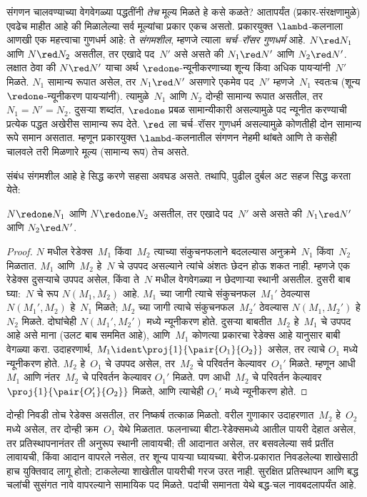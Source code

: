 संगणन चालवण्याच्या वेगवेगळ्या पद्धतींनी \emph{तेच}
मूल्य मिळते हे कसे कळते? आतापर्यंत (प्रकार-संरक्षणामुळे)
एवढेच माहीत आहे की मिळालेल्या सर्व मूल्यांचा प्रकार एकच
असतो. प्रकारयुक्त $\lambd$-कलनाला आणखी एक महत्त्वाचा
गुणधर्म आहे: ते \emph{संगमशील}, म्हणजे त्याला
\emph{चर्च–रॉसर गुणधर्म} आहे. $N \red N_1$ आणि
$N \red N_2$ असतील, तर एखादे पद~$N'$ असे असते की
$N_1 \red N'$ आणि $N_2 \red N'$. लक्षात ठेवा की
$N \red N'$ याचा अर्थ $\redone$-न्यूनीकरणाच्या
शून्य किंवा अधिक पायऱ्यांनी~$N'$ मिळते.
$N_1$ सामान्य रूपात असेल, तर $N_1 \red N'$ असणारे
एकमेव पद~$N'$ म्हणजे~$N_1$ स्वतःच (शून्य
$\redone$-न्यूनीकरण पायऱ्यांनी). त्यामुळे~$N_1$ आणि
$N_2$ दोन्ही सामान्य रूपात असतील, तर $N_1 = N' = N_2$.
दुसऱ्या शब्दांत, $\redone$ प्रबळ सामान्यीकारी असल्यामुळे
पद न्यूनीत करण्याची प्रत्येक पद्धत अखेरीस सामान्य रूप देते.
$\red$ ला चर्च–रॉसर गुणधर्म असल्यामुळे कोणतीही दोन
सामान्य रूपे समान असतात. म्हणून प्रकारयुक्त
$\lambd$-कलनातील संगणन नेहमी थांबते आणि ते कसेही
चालवले तरी मिळणारे मूल्य (सामान्य रूप) तेच असते.

संबंध संगमशील आहे हे सिद्ध करणे सहसा अवघड असते.
तथापि, पुढील दुर्बल अट सहज सिद्ध करता येते:

\begin{prop}[दुर्बल चर्च–रॉसर गुणधर्म]
$N \redone N_1$ आणि $N \redone N_2$ असतील, तर एखादे
पद~$N'$ असे असते की $N_1 \red N'$ आणि $N_2 \red N'$.
\end{prop}

\begin{proof}
  $N$ मधील रेडेक्स~$M_1$ किंवा~$M_2$ त्याच्या संकुचनफलाने
  बदलल्यास अनुक्रमे~$N_1$ किंवा~$N_2$ मिळतात.
  $M_1$ आणि~$M_2$ हे~$N$ चे उपपद असल्याने त्यांचे
  अंशतः छेदन होऊ शकत नाही. म्हणजे एक रेडेक्स दुसऱ्याचे
  उपपद असेल, किंवा ते~$N$ मधील वेगवेगळ्या न छेदणाऱ्या
  स्थानी असतील. दुसरी बाब घ्या:~$N$ चे रूप $N(M_1,M_2)$
  आहे. $M_1$ च्या जागी त्याचे संकुचनफल~$M_1'$ ठेवल्यास
  $N(M_1',M_2)$ हे~$N_1$ मिळते; $M_2$ च्या जागी त्याचे
  संकुचनफल~$M_2'$ ठेवल्यास $N(M_1,M_2')$ हे~$N_2$
  मिळते. दोघांचेही $N(M_1',M_2')$ मध्ये न्यूनीकरण होते.
  दुसऱ्या बाबतीत~$M_2$ हे~$M_1$ चे उपपद आहे असे माना
  (उलट बाब सममित आहे), आणि~$M_1$ कोणत्या प्रकारचा
  रेडेक्स आहे यानुसार बाबी वेगळ्या करा. उदाहरणार्थ,
  $M_1 \ident \proj{1}{\pair{O_1}{O_2}}$ असेल, तर त्याचे
  $O_1$ मध्ये न्यूनीकरण होते. $M_2$ हे~$O_1$ चे उपपद
  असेल, तर~$M_2$ चे परिवर्तन केल्यावर~$O_1'$ मिळते.
  म्हणून आधी~$M_1$ आणि नंतर~$M_2$ चे परिवर्तन केल्यावर
  $O_1'$ मिळते. पण आधी~$M_2$ चे परिवर्तन केल्यावर
  $\proj{1}{\pair{O_1'}{O_2}}$ मिळते, आणि त्याचेही
  $O_1'$ मध्ये न्यूनीकरण होते.
\end{proof}
दोन्ही निवडी तोच रेडेक्स असतील, तर निष्कर्ष तत्काळ
मिळतो. वरील गुणाकार उदाहरणात~$M_2$ हे~$O_2$ मध्ये
असेल, तर दोन्ही क्रम~$O_1$ येथे मिळतात. फलनाच्या
बीटा-रेडेक्समध्ये आतील पायरी देहात असेल, तर
प्रतिस्थापनानंतर ती अनुरूप स्थानी लावायची; ती आदानात
असेल, तर बसवलेल्या सर्व प्रतींत लावायची, किंवा आदान
वापरले नसेल, तर शून्य पायऱ्या घ्यायच्या. बेरीज-प्रकारात
निवडलेल्या शाखेसाठी हाच युक्तिवाद लागू होतो; टाकलेल्या
शाखेतील पायरीची गरज उरत नाही. सुरक्षित प्रतिस्थापन
आणि बद्ध चलांची सुसंगत नावे वापरल्याने सामायिक पद
मिळते. पदांची समानता येथे बद्ध-चल नावबदलापर्यंत आहे.

